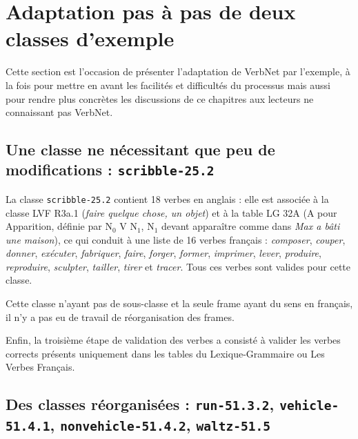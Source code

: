 \section{Adaptation pas à pas de deux classes d'exemple}
\label{exempleadaptation}

Cette section est l'occasion de présenter l'adaptation de VerbNet par
l'exemple, à la fois pour mettre en avant les facilités et difficultés du
processus mais aussi pour rendre plus concrètes les discussions de ce chapitres
aux lecteurs ne connaissant pas VerbNet.

\subsection{Une classe ne nécessitant que peu de modifications :
\texttt{scribble-25.2}}
\label{exemple_scribble}

La classe {\color{blue}\texttt{scribble-25.2}} contient 18 verbes en anglais :
elle est associée à la classe LVF {\color{red}R3a.1} (\textit{faire quelque
chose, un objet}) et à la table LG {\color{green}32A} (A pour Apparition,
définie par N$_0$ V N$_1$, N$_1$ devant apparaître comme dans \textit{Max a
bâti une maison}), ce qui conduit à une liste de 16 verbes français :
\textit{composer}, \textit{couper}, \textit{donner}, \textit{exécuter},
\textit{fabriquer}, \textit{faire}, \textit{forger}, \textit{former},
\textit{imprimer}, \textit{lever}, \textit{produire}, \textit{reproduire},
\textit{sculpter}, \textit{tailler}, \textit{tirer} et \textit{tracer}. Tous
ces verbes sont valides pour cette classe.

Cette classe n'ayant pas de sous-classe et la seule frame ayant du sens en
français, il n'y a pas eu de travail de réorganisation des frames.

Enfin, la troisième étape de validation des verbes a consisté à valider les
verbes corrects présents uniquement dans les tables du Lexique-Grammaire ou Les
Verbes Français.

\subsection{Des classes réorganisées : \texttt{run-51.3.2},
\texttt{vehicle-51.4.1}, \texttt{nonvehicle-51.4.2}, \texttt{waltz-51.5}}

